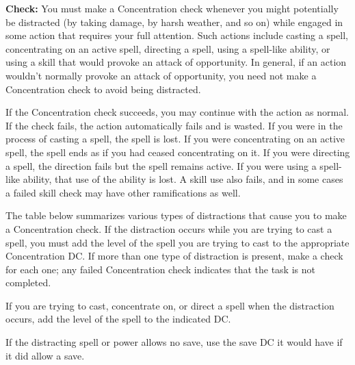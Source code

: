 \textbf{Check:} You must make a Concentration check whenever you might potentially be distracted (by taking damage, by harsh weather, and so on) while engaged in some action that requires your full attention. Such actions include casting a spell, concentrating on an active spell, directing a spell, using a spell-like ability, or using a skill that would provoke an attack of opportunity. In general, if an action wouldn’t normally provoke an attack of opportunity, you need not make a Concentration check to avoid being distracted.

If the Concentration check succeeds, you may continue with the action as normal. If the check fails, the action automatically fails and is wasted. If you were in the process of casting a spell, the spell is lost. If you were concentrating on an active spell, the spell ends as if you had ceased concentrating on it. If you were directing a spell, the direction fails but the spell remains active. If you were using a spell-like ability, that use of the ability is lost. A skill use also fails, and in some cases a failed skill check may have other ramifications as well.

The table below summarizes various types of distractions that cause you to make a Concentration check. If the distraction occurs while you are trying to cast a spell, you must add the level of the spell you are trying to cast to the appropriate Concentration DC. If more than one type of distraction is present, make a check for each one; any failed Concentration check indicates that the task is not completed.

If you are trying to cast, concentrate on, or direct a spell when the distraction occurs, add the level of the spell to the indicated DC.

If the distracting spell or power allows no save, use the save DC it would have if it did allow a save.

